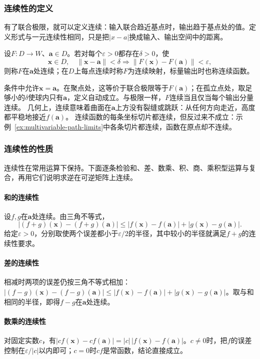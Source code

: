\subsubsection{连续性的定义}
\label{sec:multivariable-continuity-definition}

有了联合极限，就可以定义连续：输入联合趋近基点时，输出趋于基点处的值。定义形式与一元连续性相同，只是把$|x-a|$换成输入、输出空间中的距离。
\begin{definition}[映射的连续性]
\label{def:multivariable-scalar-continuity}
设$F:D\to W$、$\bm a\in D$。若对每个$\varepsilon>0$都存在$\delta>0$，使
\[
 \bm x\in D,\quad\lVert\bm x-\bm a\rVert<\delta
 \Longrightarrow \lVert F(\bm x)-F(\bm a)\rVert<\varepsilon,
\]
则称$F$在$\bm a$处连续；在$D$上每点连续时称$F$为连续映射，标量输出时也称连续函数。
\end{definition}
条件中允许$\bm x=\bm a$。在聚点处，这等价于联合极限等于$F(\bm a)$；在孤立点处，取足够小的$\delta$使球内只有$\bm a$，定义自动成立。与极限一样，$F$连续当且仅当每个输出分量连续。
几何上，连续意味着曲面在$\bm a$上方没有裂缝或跳跃：从任何方向走近，高度都平稳地接近$f(\bm a)$。
连续函数的每条坐标切片都连续，但反过来不成立：示例~\ref{ex:multivariable-path-limits}中各条切片都连续，函数在原点却不连续。

\subsubsection{连续性的性质}
\label{sec:multivariable-continuity-properties}

连续性在常用运算下保持。下面逐条检验和、差、数乘、积、商、乘积型运算与复合，再用它们说明求逆在可逆矩阵上连续。

\paragraph{和的连续性}
设$f,g$在$\bm a$处连续。由三角不等式，
\[
 |(f+g)(\bm x)-(f+g)(\bm a)|\leq|f(\bm x)-f(\bm a)|+|g(\bm x)-g(\bm a)|.
\]
给定$\varepsilon>0$，分别取使两个误差都小于$\varepsilon/2$的半径，其中较小的半径就满足$f+g$的连续性要求。

\paragraph{差的连续性}
相减时两项的误差仍按三角不等式相加：$|(f-g)(\bm x)-(f-g)(\bm a)|\leq|f(\bm x)-f(\bm a)|+|g(\bm x)-g(\bm a)|$。取与和相同的半径，即得$f-g$在$\bm a$处连续。

\paragraph{数乘的连续性}
对固定实数$c$，有$|cf(\bm x)-cf(\bm a)|=|c|\,|f(\bm x)-f(\bm a)|$。$c\neq0$时，把$f$的误差控制在$\varepsilon/|c|$以内即可；$c=0$时$cf$是常函数，结论直接成立。

